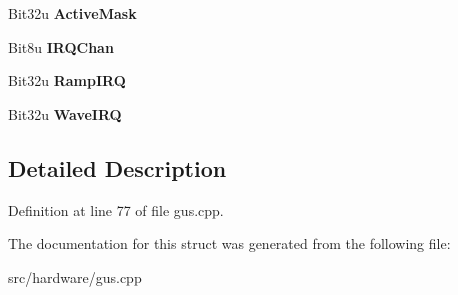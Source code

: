 \begin{DoxyCompactItemize}
\item 
\hypertarget{structGFGus_a2d78af798c38826042b4c8ef23ebe32f}{Bit32u {\bfseries Active\-Mask}}\label{structGFGus_a2d78af798c38826042b4c8ef23ebe32f}

\item 
\hypertarget{structGFGus_a4dcb3649a667a97aede4f09ded0ace2a}{Bit8u {\bfseries I\-R\-Q\-Chan}}\label{structGFGus_a4dcb3649a667a97aede4f09ded0ace2a}

\item 
\hypertarget{structGFGus_a6020128163cdd56bbb231a5c07630e24}{Bit32u {\bfseries Ramp\-I\-R\-Q}}\label{structGFGus_a6020128163cdd56bbb231a5c07630e24}

\item 
\hypertarget{structGFGus_aa5d5f4fadf04254e2d7d4c1e5b3ccffc}{Bit32u {\bfseries Wave\-I\-R\-Q}}\label{structGFGus_aa5d5f4fadf04254e2d7d4c1e5b3ccffc}

\end{DoxyCompactItemize}


\subsection{Detailed Description}


Definition at line 77 of file gus.\-cpp.



The documentation for this struct was generated from the following file\-:\begin{DoxyCompactItemize}
\item 
src/hardware/gus.\-cpp\end{DoxyCompactItemize}
